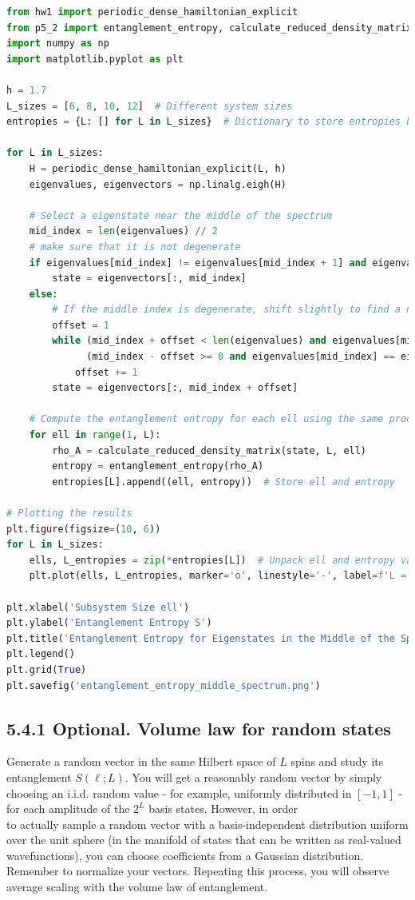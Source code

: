\documentclass[12pt]{article}
\begin{document}
\begin{lstlisting}[language=Python]
from hw1 import periodic_dense_hamiltonian_explicit
from p5_2 import entanglement_entropy, calculate_reduced_density_matrix
import numpy as np
import matplotlib.pyplot as plt

h = 1.7
L_sizes = [6, 8, 10, 12]  # Different system sizes
entropies = {L: [] for L in L_sizes}  # Dictionary to store entropies by L

for L in L_sizes:
    H = periodic_dense_hamiltonian_explicit(L, h)
    eigenvalues, eigenvectors = np.linalg.eigh(H)

    # Select a eigenstate near the middle of the spectrum
    mid_index = len(eigenvalues) // 2
    # make sure that it is not degenerate
    if eigenvalues[mid_index] != eigenvalues[mid_index + 1] and eigenvalues[mid_index] != eigenvalues[mid_index - 1]:
        state = eigenvectors[:, mid_index]
    else:
        # If the middle index is degenerate, shift slightly to find a non-degenerate state
        offset = 1
        while (mid_index + offset < len(eigenvalues) and eigenvalues[mid_index] == eigenvalues[mid_index + offset]) or \
              (mid_index - offset >= 0 and eigenvalues[mid_index] == eigenvalues[mid_index - offset]):
            offset += 1
        state = eigenvectors[:, mid_index + offset]

    # Compute the entanglement entropy for each ell using the same procedure as in p5_2.py
    for ell in range(1, L):
        rho_A = calculate_reduced_density_matrix(state, L, ell)
        entropy = entanglement_entropy(rho_A)
        entropies[L].append((ell, entropy))  # Store ell and entropy

# Plotting the results
plt.figure(figsize=(10, 6))
for L in L_sizes:
    ells, L_entropies = zip(*entropies[L])  # Unpack ell and entropy values for each L
    plt.plot(ells, L_entropies, marker='o', linestyle='-', label=f'L = {L}')

plt.xlabel('Subsystem Size ell')
plt.ylabel('Entanglement Entropy S')
plt.title('Entanglement Entropy for Eigenstates in the Middle of the Spectrum')
plt.legend()
plt.grid(True)
plt.savefig('entanglement_entropy_middle_spectrum.png')
\end{lstlisting}
\newpage
\subsection*{5.4.1 Optional. Volume law for random states}
Generate a random vector in the same Hilbert space of $L$ spins and study its entanglement $S(\ell ; L)$. You will get a reasonably random vector by simply choosing an i.i.d. random value - for example, uniformly distributed in $[-1,1]$ - for each amplitude of the $2^{L}$ basis states. However, in order\\
to actually sample a random vector with a basis-independent distribution uniform over the unit sphere (in the manifold of states that can be written as real-valued wavefunctions), you can choose coefficients from a Gaussian distribution. Remember to normalize your vectors. Repeating this process, you will observe average scaling with the volume law of entanglement.
\end{document}
